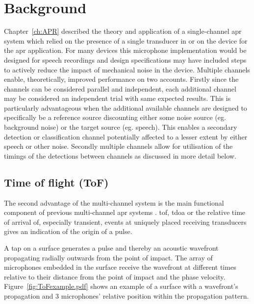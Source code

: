 \section{Background}
Chapter~\ref{ch:APR} described the theory and application of a single-channel \gls{apr} system which relied on the presence of a single transducer in or on the device for the \gls{apr} application. For many devices this microphone implementation would be designed for speech recordings and design specifications may have included steps to actively reduce the impact of mechanical noise in the device. Multiple channels enable, theoretically, improved performance on two accounts. Firstly since the channels can be considered parallel and independent, each additional channel may be considered an independent trial with same expected results. This is particularly advantageous when the additional available channels are designed to specifically be a reference source discounting either some noise source (eg. background noise) or the target source (eg. speech). This enables a secondary detection or classification channel potentially affected to a lesser extent by either speech or other noise. Secondly multiple channels allow for utilisation of the timings of the detections between channels as discussed in more detail below.

\subsection{Time of flight (ToF)}
The second advantage of the multi-channel system is the main functional component of previous multi-channel \gls{apr} systems \cite{TouchSystems2006}\cite{US7411581}. \gls{tof}, \gls{tdoa} or the relative time of arrival of, especially transient, events at uniquely placed receiving transducers gives an indication of the origin of a pulse.

A tap on a surface generates a pulse and thereby an acoustic wavefront propagating radially outwards from the point of impact. The array of microphones embedded in the surface receive the wavefront at different times relative to their distance from the point of impact and the phase velocity. Figure~\ref{fig:ToFexample.pdf} shows an example of a surface with a wavefront's propagation and 3 microphones' relative position within the propagation pattern.

